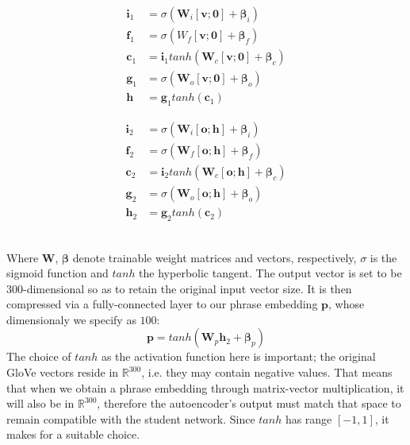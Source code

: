 \documentclass[a4paper,11pt]{article}
\begin{document}
\hspace{-50pt}
\begin{minipage}{0.55\textwidth}
	\begin{align}
	\mathbf{i}_1 &= \sigma(\mathbf{W}_i[\mathbf{v};\mathbf{0}] + \pmb{\beta}_i) \tag{Input Gate : t=1}\\
	\mathbf{f}_1 &= \sigma(W_f[\mathbf{v};\mathbf{0}] + \pmb{\beta}_f) \tag{Forget Gate : t=1}\\
	\mathbf{c}_1 &= \mathbf{i}_1 tanh(\mathbf{W}_c[\mathbf{v};\pmb{0}] + \pmb{\beta}_c) \tag{Memory Cell: t=1}\\
	\mathbf{g}_1 &= \sigma(\mathbf{W}_o[\mathbf{v};\mathbf{0}] + \pmb{\beta}_o) \tag{Output Gate: t=1}\\
	\mathbf{h} &= \mathbf{g}_1 tanh(\mathbf{c}_1) \tag{Hidden Vector}
	\end{align}
\end{minipage}
\hspace{10pt}
\begin{minipage}{0.55\textwidth}
	\begin{align}
	\mathbf{i}_2 &= \sigma(\mathbf{W}_i[\mathbf{o};\mathbf{h}] + \pmb{\beta}_i) \tag{Input Gate : t=2}\\
	\mathbf{f}_2 &= \sigma(\mathbf{W}_f[\mathbf{o};\mathbf{h}] + \pmb{\beta}_f) \tag{Forget Gate : t=2}\\
	\mathbf{c}_2 &= \mathbf{i}_2 tanh(\mathbf{W}_c[\mathbf{o};\pmb{h}] + \pmb{\beta}_c) \tag{Memory Cell: t=2}\\
	\mathbf{g}_2 &= \sigma(\mathbf{W}_o[\mathbf{o};\mathbf{h}] + \pmb{\beta}_o) \tag{Output Gate: t=2}\\
	\mathbf{h}_2 &= \mathbf{g}_2 tanh(\pmb{c}_2) \tag{Output Vector}
	\end{align}
\end{minipage}
\\

Where $\textbf{W}$, $\pmb{\beta}$ denote trainable weight matrices and vectors, respectively, $\sigma$ is the sigmoid function and $tanh$ the hyperbolic tangent. The output vector is set to be $300$-dimensional so as to retain the original input vector size. It is then compressed via a fully-connected layer to our phrase embedding $\mathbf{p}$, whose dimensionaly we specify as $100$:
\[
\mathbf{p} = tanh(\mathbf{W}_p\mathbf{h}_2 + \pmb{\beta}_p)
\]
The choice of $tanh$ as the activation function here is important; the original GloVe vectors reside in $\mathbb{R}^{300}$, i.e. they may contain negative values. That means that when we obtain a phrase embedding through matrix-vector multiplication, it will also be in $\mathbb{R}^{300}$, therefore the autoencoder's output must match that space to remain compatible with the student network. Since $tanh$ has range $[-1,1]$, it makes for a suitable choice.
\end{document}

